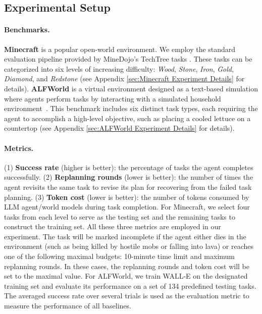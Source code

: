 \documentclass{article} %
\begin{document}
\subsection{Experimental Setup}

\paragraph{Benchmarks.}\textbf{Minecraft} is a popular open-world environment.
We employ the standard evaluation pipeline provided by MineDojo's TechTree tasks \citep{fan2022minedojo}. These tasks can be categorized into six levels of increasing difficulty: \textit{Wood}, \textit{Stone}, \textit{Iron}, \textit{Gold}, \textit{Diamond}, and \textit{Redstone} (see Appendix \ref{sec:Minecraft Experiment Details} for details).
\textbf{ALFWorld} is a virtual environment designed as a text-based simulation where agents perform tasks by interacting with a simulated household environment~\citep{shridhar2020alfworld}. This benchmark includes six distinct task types, each requiring the agent to accomplish a high-level objective, such as placing a cooled lettuce on a countertop  (see Appendix \ref{sec:ALFWorld Experiment Details} for details).



\paragraph{Metrics.}(1) \textbf{Success rate} (higher is better): the percentage of tasks the agent completes successfully. (2) \textbf{Replanning rounds} (lower is better): the number of times the agent revisits the same task to revise its plan for recovering from the failed task planning. (3) \textbf{Token cost} (lower is better): the number of tokens consumed by LLM agent/world models during task completion.
For Minecraft, we select four tasks from each level to serve as the testing set and the remaining tasks to construct the training set. 
All these three metrics are employed in our experiment.
The task will be marked incomplete if the agent either dies in the environment (such as being killed by hostile mobs or falling into lava) or reaches one of the following maximal budgets: 10-minute time limit and maximum replanning rounds. In these cases, the replanning rounds and token cost will be set to the maximal value. 
For ALFWorld, we train WALL-E on the designated training set and evaluate its performance on a set of 134 predefined testing tasks. The averaged success rate over several trials is used as the evaluation metric to measure the performance of all baselines.
\end{document}

